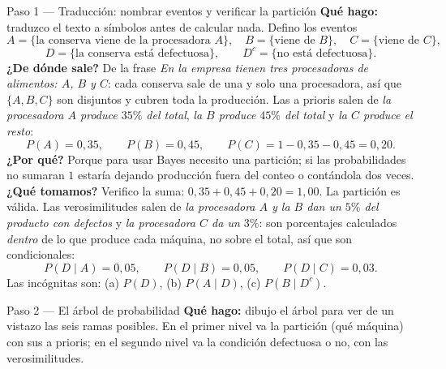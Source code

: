 \documentclass[11pt]{article}
\begin{document}
\begin{sol}

\begin{paso}{Paso 1 --- Traducción: nombrar eventos y verificar la partición}
\textbf{Qué hago:} traduzco el texto a símbolos antes de calcular nada. Defino los eventos
\[
A=\{\text{la conserva viene de la procesadora }A\},\quad
B=\{\text{viene de }B\},\quad
C=\{\text{viene de }C\},
\]
\[
D=\{\text{la conserva está defectuosa}\},\qquad D^{c}=\{\text{no está defectuosa}\}.
\]
\textbf{¿De dónde sale?} De la frase \emph{En la empresa tienen tres procesadoras de alimentos: $A$, $B$ y $C$}: cada conserva sale de una y solo una procesadora, así que $\{A,B,C\}$ son disjuntos y cubren toda la producción. Las a prioris salen de \emph{la procesadora $A$ produce $35\%$ del total}, \emph{la $B$ produce $45\%$ del total} y \emph{la $C$ produce el resto}:
\[
P(A)=0,35,\qquad P(B)=0,45,\qquad P(C)=1-0,35-0,45=0,20.
\]
\textbf{¿Por qué?} Porque para usar Bayes necesito una partición; si las probabilidades no sumaran $1$ estaría dejando producción fuera del conteo o contándola dos veces.
\textbf{¿Qué tomamos?} Verifico la suma: $0,35+0,45+0,20=1,00$. La partición es válida. Las verosimilitudes salen de \emph{la procesadora $A$ y la $B$ dan un $5\%$ del producto con defectos} y \emph{la procesadora $C$ da un $3\%$}: son porcentajes calculados \emph{dentro} de lo que produce cada máquina, no sobre el total, así que son condicionales:
\[
P(D\mid A)=0,05,\qquad P(D\mid B)=0,05,\qquad P(D\mid C)=0,03.
\]
Las incógnitas son: (a) $P(D)$, (b) $P(A\mid D)$, (c) $P(B\mid D^{c})$.
\end{paso}

\begin{paso}{Paso 2 --- El árbol de probabilidad}
\textbf{Qué hago:} dibujo el árbol para ver de un vistazo las seis ramas posibles. En el primer nivel va la partición (qué máquina) con sus a prioris; en el segundo nivel va la condición defectuosa o no, con las verosimilitudes.

\begin{center}
\shorthandoff{<>}
\end{center}
\end{paso}
\end{sol}
\end{document}
